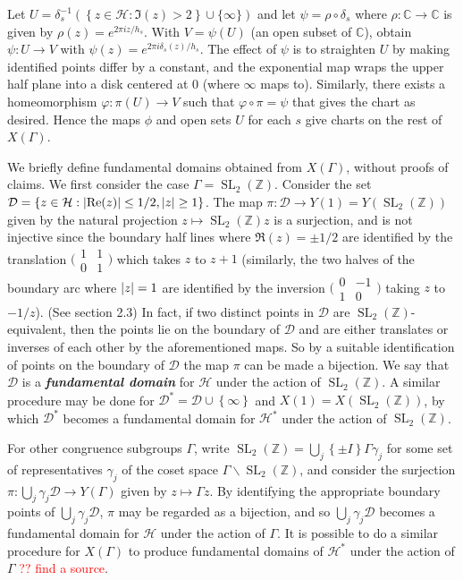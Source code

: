 \documentclass[10pt,leqno,twoside,b5paper]{article}
\theoremstyle{plain}
\theoremstyle{definition}
\numberwithin{equation}{section}
\numberwithin{lem}{section}
\newcommand{\cbr}[1]{\left\{#1\right\}}
\newcommand{\textib}[1]{\textbf{\textit{#1\index{#1}}}} %
\DeclareMathOperator{\SL}{SL}
\newcommand{\slz}{\SL_2(\mathbb{Z})}
\newcommand{\sai}[1]{\textcolor{red}{#1}}
\begin{document}
Let $U = \delta_s^{-1}(\cbr{z\in\mathcal H : \Im(z) > 2}\cup\{\infty\})$ and let $\psi = \rho\circ \delta_s$ where $\rho\colon \mathbb C\to\mathbb C$ is given by $\rho(z) = e^{2\pi i z/h_s}$. With $V = \psi(U)$ (an open subset of $\mathbb C$), obtain $\psi\colon U\to V$ with $\psi(z) = e^{2\pi i \delta_s(z)/h_s}$. The effect of $\psi$ is to straighten $U$ by making identified points differ by a constant, and the exponential map wraps the upper half plane into a disk centered at $0$ (where $\infty$ maps to). Similarly, there exists a homeomorphism $\varphi\colon \pi(U)\to V$ such that $\varphi\circ\pi = \psi$ that gives the chart as desired. Hence the maps $\phi$ and open sets $U$ for each $s$ give charts on the rest of $X(\varGamma)$.

We briefly define fundamental domains obtained from $X(\varGamma)$, without proofs of claims. We first consider the case $\varGamma = \slz$. Consider the set $\mathcal D = \cbr{z\in\mathcal H : \abs{\Re(z)}\leq 1/2,\abs{z}\geq 1}$. The map $\pi\colon\mathcal D\to Y(1) = Y(\slz)$ given by the natural projection $z\mapsto \slz z$ is a surjection, and is not injective since the boundary half lines where $\Re(z) = \pm 1/2$ are identified by the translation $\big(\!\begin{smallmatrix}
    1 & 1 \\ 0 & 1
\end{smallmatrix}\!\big)$ which takes $z$ to $z+1$ (similarly, the two halves of the boundary arc where $\abs{z} = 1$ are identified by the inversion $\big(\!\begin{smallmatrix}
    0 & -1 \\ 1 & 0
\end{smallmatrix}\!\big)$ taking $z$ to $-1/z$). (See \cite{diamond} section 2.3) In fact, if two distinct points in $\mathcal D$ are $\slz$-equivalent, then the points lie on the boundary of $\mathcal D$ and are either translates or inverses of each other by the aforementioned maps. So by a suitable identification of points on the boundary of $\mathcal D$ the map $\pi$ can be made a bijection. We say that $\mathcal D$ is a \textib{fundamental domain} for $\mathcal H$ under the action of $\slz$. A similar procedure may be done for $\mathcal D^\ast = \mathcal D \cup\cbr{\infty}$ and $X(1) = X(\slz)$, by which $\mathcal D^\ast$ becomes a fundamental domain for $\mathcal H^\ast$ under the action of $\slz$. 

For other congruence subgroups $\varGamma$, write $\slz = \bigcup_j \cbr{\pm I}\varGamma \gamma_j$ for some set of representatives $\gamma_j$ of the coset space $\varGamma\backslash \slz$, and consider the surjection $\pi\colon \bigcup_j \gamma_j\mathcal D\to Y(\varGamma)$ given by $z\mapsto \varGamma z$. By identifying the appropriate boundary points of $\bigcup_j \gamma_j\mathcal D$, $\pi$ may be regarded as a bijection, and so $\bigcup_j \gamma_j\mathcal D$ becomes a fundamental domain for $\mathcal H$ under the action of $\varGamma$. It is possible to do a similar procedure for $X(\varGamma)$ to produce fundamental domains of $\mathcal H^\ast$ under the action of $\varGamma$ \sai{?? find a source}. 
\end{document}

